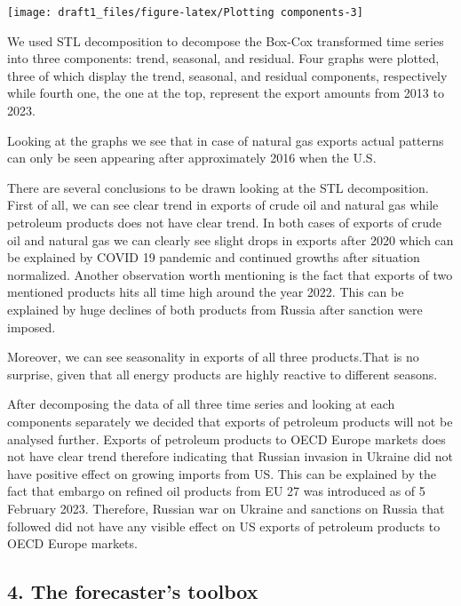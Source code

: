 \documentclass[
]{article}
\begin{document}
\begin{center}\texttt{[image: draft1\_files/figure-latex/Plotting components-3]} \end{center}

We used STL decomposition to decompose the Box-Cox transformed time
series into three components: trend, seasonal, and residual. Four graphs
were plotted, three of which display the trend, seasonal, and residual
components, respectively while fourth one, the one at the top, represent
the export amounts from 2013 to 2023.

Looking at the graphs we see that in case of natural gas exports actual
patterns can only be seen appearing after approximately 2016 when the
U.S.

There are several conclusions to be drawn looking at the STL
decomposition. First of all, we can see clear trend in exports of crude
oil and natural gas while petroleum products does not have clear trend.
In both cases of exports of crude oil and natural gas we can clearly see
slight drops in exports after 2020 which can be explained by COVID 19
pandemic and continued growths after situation normalized. Another
observation worth mentioning is the fact that exports of two mentioned
products hits all time high around the year 2022. This can be explained
by huge declines of both products from Russia after sanction were
imposed.

Moreover, we can see seasonality in exports of all three products.That
is no surprise, given that all energy products are highly reactive to
different seasons.

After decomposing the data of all three time series and looking at each
components separately we decided that exports of petroleum products will
not be analysed further. Exports of petroleum products to OECD Europe
markets does not have clear trend therefore indicating that Russian
invasion in Ukraine did not have positive effect on growing imports from
US. This can be explained by the fact that embargo on refined oil
products from EU 27 was introduced as of 5 February 2023. Therefore,
Russian war on Ukraine and sanctions on Russia that followed did not
have any visible effect on US exports of petroleum products to OECD
Europe markets.

\hypertarget{the-forecasters-toolbox}{%
\subsection{4. The forecaster's toolbox}\label{the-forecasters-toolbox}}
\end{document}
